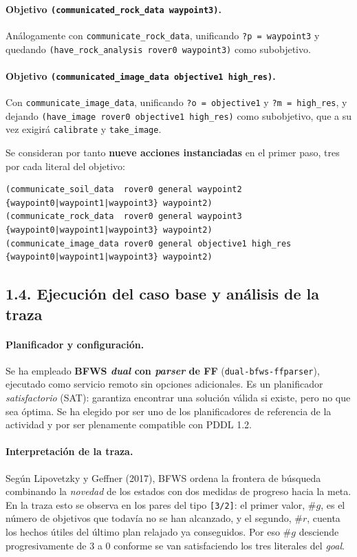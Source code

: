 \documentclass[12pt,a4paper]{article}
\begin{document}
\paragraph{Objetivo \texttt{(communicated\_rock\_data waypoint3)}.}
An\'alogamente con \texttt{communicate\_rock\_data}, unificando
\texttt{?p\,=\,waypoint3} y quedando
\texttt{(have\_rock\_analysis rover0 waypoint3)} como subobjetivo.

\paragraph{Objetivo \texttt{(communicated\_image\_data objective1 high\_res)}.}
Con \texttt{communicate\_image\_data}, unificando \texttt{?o\,=\,objective1}
y \texttt{?m\,=\,high\_res}, y dejando
\texttt{(have\_image rover0 objective1 high\_res)} como subobjetivo, que a su
vez exigir\'a \texttt{calibrate} y \texttt{take\_image}.

\medskip
Se consideran por tanto \textbf{nueve acciones instanciadas} en el primer
paso, tres por cada literal del objetivo:

\begin{lstlisting}
(communicate_soil_data  rover0 general waypoint2 {waypoint0|waypoint1|waypoint3} waypoint2)
(communicate_rock_data  rover0 general waypoint3 {waypoint0|waypoint1|waypoint3} waypoint2)
(communicate_image_data rover0 general objective1 high_res {waypoint0|waypoint1|waypoint3} waypoint2)
\end{lstlisting}

\subsection{1.4. Ejecuci\'on del caso base y an\'alisis de la traza}

\paragraph{Planificador y configuraci\'on.}
Se ha empleado \textbf{BFWS \emph{dual} con \emph{parser} de FF}
(\texttt{dual-bfws-ffparser}), ejecutado como servicio remoto sin opciones
adicionales. Es un planificador \emph{satisfactorio} (SAT): garantiza
encontrar una soluci\'on v\'alida si existe, pero no que sea \'optima. Se ha
elegido por ser uno de los planificadores de referencia de la actividad y
por ser plenamente compatible con PDDL 1.2.

\paragraph{Interpretaci\'on de la traza.}
Seg\'un Lipovetzky y Geffner (2017), BFWS ordena la frontera de b\'usqueda
combinando la \emph{novedad} de los estados con dos medidas de progreso
hacia la meta. En la traza esto se observa en los pares del tipo
\texttt{[3/2]}: el primer valor, $\#g$, es el n\'umero de objetivos que
todav\'ia no se han alcanzado, y el segundo, $\#r$, cuenta los hechos
\'utiles del \'ultimo plan relajado ya conseguidos. Por eso $\#g$ desciende
progresivamente de 3 a 0 conforme se van satisfaciendo los tres literales
del \emph{goal}.
\end{document}
